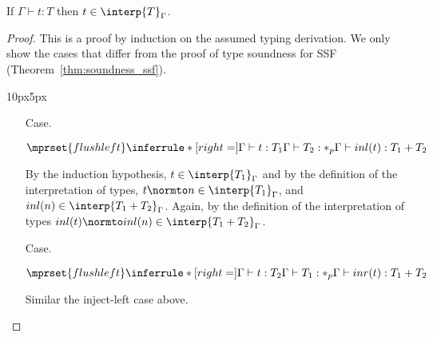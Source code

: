 \begin{thm}
  If $\Gamma \vdash t:T$ then $t \in \interp{T}_\Gamma$.
  \label{thm:soundness_ssfp}
\end{thm}
\begin{proof}
  This is a proof by induction on the assumed typing derivation.  We
  only show the cases that differ from the proof of type soundness for
  SSF (Theorem~\ref{thm:soundness_ssf}).
\vspace{-25px}
\begin{changemargin}{10px}{5px}\noindent
\begin{itemize}  
\item[Case.]\ \\
  \begin{center}
    \begin{math}
      $$\mprset{flushleft}
      \inferrule* [right=] {
        \Gamma \vdash t:T_1
	\\
	\Gamma \vdash T_2:*_p
      }{\Gamma \vdash inl(t): T_1+T_2}
    \end{math}
  \end{center}
  By the induction hypothesis, $t \in \interp{T_1}_\Gamma$ and by the definition of the 
  interpretation of types,
  $t \normto n \in \interp{T_1}_\Gamma$, and $inl(n) \in \interp{T_1 + T_2}_{\Gamma}$.  
  Again, by the definition of the interpretation of types
  $inl(t) \normto inl(n) \in \interp{T_1 + T_2}_\Gamma$.
  
\item[Case.]\ \\
  \begin{center}
    \begin{math}
      $$\mprset{flushleft}
      \inferrule* [right=] {
        \Gamma \vdash t:T_2
	\\
	\Gamma \vdash T_1:*_p
      }{\Gamma \vdash inr(t): T_1+T_2}
    \end{math}
  \end{center}
  Similar the inject-left case above.
  

\end{itemize}
\end{changemargin}
\end{proof}
